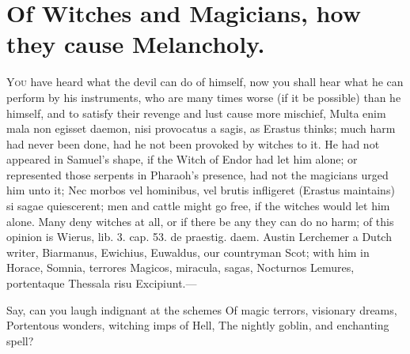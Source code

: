 {%
\clearpage{}
\thispagestyle{titleontop}

\section[Witches and Magicians]{Of Witches and Magicians, how they cause Melancholy.}

\lettrine{Y}{ou} have heard what the devil can do of himself, now you shall hear
what he can perform by his instruments, who are many times worse (if it
be possible) than he himself, and to satisfy their revenge and lust
cause more mischief, Multa enim mala non egisset daemon, nisi
provocatus a sagis, as Erastus thinks; much harm had never been
done, had he not been provoked by witches to it. He had not appeared in
Samuel's shape, if the Witch of Endor had let him alone; or represented
those serpents in Pharaoh's presence, had not the magicians urged him
unto it; Nec morbos vel hominibus, vel brutis infligeret (Erastus
maintains) si sagae quiescerent; men and cattle might go free, if the
witches would let him alone. Many deny witches at all, or if there be
any they can do no harm; of this opinion is Wierus, lib. 3. cap. 53. de
praestig. daem. Austin Lerchemer a Dutch writer, Biarmanus, Ewichius,
Euwaldus, our countryman Scot; with him in Horace,
Somnia, terrores Magicos, miracula, sagas,
Nocturnos Lemures, portentaque Thessala risu
Excipiunt.---

Say, can you laugh indignant at the schemes
Of magic terrors, visionary dreams,
Portentous wonders, witching imps of Hell,
The nightly goblin, and enchanting spell?

}
